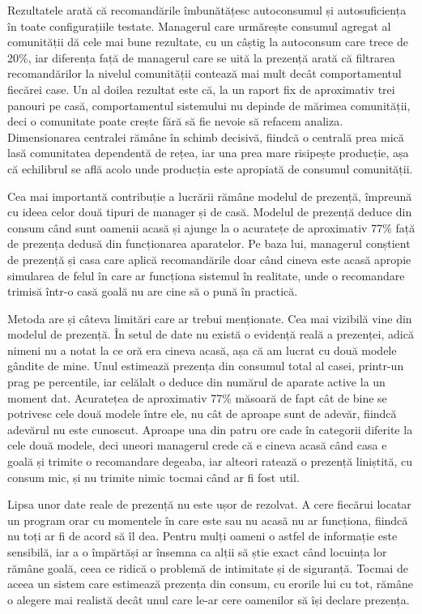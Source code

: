 \documentclass[12pt,a4paper]{report}
\begin{document}
Rezultatele arată că recomandările îmbunătățesc autoconsumul și autosuficiența în toate configurațiile testate. Managerul care urmărește consumul agregat al comunității dă cele mai bune rezultate, cu un câștig la autoconsum care trece de 20\%, iar diferența față de managerul care se uită la prezență arată că filtrarea recomandărilor la nivelul comunității contează mai mult decât comportamentul fiecărei case. Un al doilea rezultat este că, la un raport fix de aproximativ trei panouri pe casă, comportamentul sistemului nu depinde de mărimea comunității, deci o comunitate poate crește fără să fie nevoie să refacem analiza. Dimensionarea centralei rămâne în schimb decisivă, fiindcă o centrală prea mică lasă comunitatea dependentă de rețea, iar una prea mare risipește producție, așa că echilibrul se află acolo unde producția este apropiată de consumul comunității.

Cea mai importantă contribuție a lucrării rămâne modelul de prezență, împreună cu ideea celor două tipuri de manager și de casă. Modelul de prezență deduce din consum când sunt oamenii acasă și ajunge la o acuratețe de aproximativ 77\% față de prezența dedusă din funcționarea aparatelor. Pe baza lui, managerul conștient de prezență și casa care aplică recomandările doar când cineva este acasă apropie simularea de felul în care ar funcționa sistemul în realitate, unde o recomandare trimisă într-o casă goală nu are cine să o pună în practică.

Metoda are și câteva limitări care ar trebui menționate. Cea mai vizibilă vine din modelul de prezență. În setul de date nu există o evidență reală a prezenței, adică nimeni nu a notat la ce oră era cineva acasă, așa că am lucrat cu două modele gândite de mine. Unul estimează prezența din consumul total al casei, printr-un prag pe percentile, iar celălalt o deduce din numărul de aparate active la un moment dat. Acuratețea de aproximativ 77\% măsoară de fapt cât de bine se potrivesc cele două modele între ele, nu cât de aproape sunt de adevăr, fiindcă adevărul nu este cunoscut. Aproape una din patru ore cade în categorii diferite la cele două modele, deci uneori managerul crede că e cineva acasă când casa e goală și trimite o recomandare degeaba, iar alteori ratează o prezență liniștită, cu consum mic, și nu trimite nimic tocmai când ar fi fost util.

Lipsa unor date reale de prezență nu este ușor de rezolvat. A cere fiecărui locatar un program orar cu momentele în care este sau nu acasă nu ar funcționa, fiindcă nu toți ar fi de acord să îl dea. Pentru mulți oameni o astfel de informație este sensibilă, iar a o împărtăși ar însemna ca alții să știe exact când locuința lor rămâne goală, ceea ce ridică o problemă de intimitate și de siguranță. Tocmai de aceea un sistem care estimează prezența din consum, cu erorile lui cu tot, rămâne o alegere mai realistă decât unul care le-ar cere oamenilor să își declare prezența.
\end{document}

